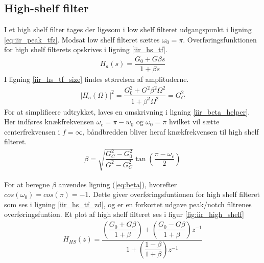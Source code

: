      \subsection{High-shelf filter}
	I et high shelf filter tages der ligesom i low shelf filteret udgangspunkt i ligning \ref{eq:iir_peak_tfz}. Modsat low shelf filteret sættes $\omega_0 = \pi$.
	Overføringsfunktionen for high shelf filterets opskrives i ligning \ref{iir_hs_tf}.
     \begin{align}
        H_a (s) = \dfrac{G_0 + G \beta s}{1 + \beta s} \label{iir_hs_tf}
     \end{align}
	I ligning \ref{iir_hs_tf_size} findes størrelsen af amplituderne.
     \begin{align}
         |H_a(\Omega)|^2 = \dfrac{G_0^2 + G^2 \beta^2 \Omega^2}{1 + \beta^2 \Omega^2} = G_C^2 \label{iir_hs_tf_size}
     \end{align}
     For at simplificere udtrykket, laves en omskrivning i ligning \ref{iir_beta_helper}. Her indføres knækfrekvensen $\omega_c = \pi - w_0$ og $\omega_0 = \pi$ hvilket vil sætte centerfrekvensen i $f = \infty$, båndbredden bliver heraf knækfrekvensen til high shelf filteret.
    \begin{align}
        \beta = \sqrt{\dfrac{G_C^2 - G_0^2}{G^2 - G_C^2}} \tan \left( \dfrac{\pi - \omega_c}{2} \right) \label{iir_beta_helper}
    \end{align}



     For at beregne $\beta$ anvendes ligning (\ref{eq:beta}), hvorefter $cos(\omega_0) = cos(\pi) = -1$. Dette giver overføringsfuntionen for high shelf filteret som ses i ligning \ref{iir_hs_tf_zd}, og er en forkortet udgave peak/notch filtrenes overføringsfuntion. Et plot af high shelf filteret ses i figur \ref{fig:iir_high_shelf}
     \begin{align}
     H_{HS}(z) =     \dfrac{\left(\dfrac{G_0 + G \beta}{1 + \beta} \right) + \left(\dfrac{ G_0 - G \beta}{1 + \beta }\right) z^{-1}}{1  + \left( \dfrac{1 - \beta}{1 + \beta} \right) z^{-1}} \label{iir_hs_tf_z}
     \end{align}
%
%


